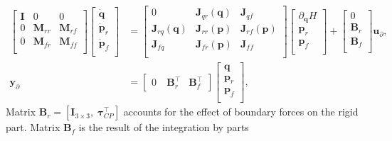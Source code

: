 \documentclass{svjour3}                     %
\begin{document}
\begin{equation}
\label{eq:EB_sys}
\begin{aligned}
\begin{bmatrix}
\mathbf{I} & 0 & 0 \\
0 & \mathbf{M}_{rr} & \mathbf{M}_{rf}\\ 
0 & \mathbf{M}_{fr} & \mathbf{M}_{ff}\\
\end{bmatrix} 
\begin{bmatrix}
\dot{\mathbf{q}} \\ 
\dot{\mathbf{p}}_{r} \\ 
\dot{\mathbf{p}}_{f} \\ 
\end{bmatrix} &= 
\begin{bmatrix}
0 & \mathbf{J}_{qr}(\mathbf{q}) & \mathbf{J}_{qf} \\
\mathbf{J}_{rq}(\mathbf{q}) & \mathbf{J}_{rr}(\mathbf{p}) & \mathbf{J}_{rf}(\mathbf{p})\\ 
\mathbf{J}_{fq} & \mathbf{J}_{fr}(\mathbf{p}) & \mathbf{J}_{ff}\\
\end{bmatrix}  
\begin{bmatrix}
\partial_{\mathbf{q}} H \\
{\mathbf{p}}_{r} \\ 
{\mathbf{p}}_{f} \\ 
\end{bmatrix} + 
\begin{bmatrix}
0 \\
\mathbf{B}_{r} \\ 
\mathbf{B}_{f} \\ 
\end{bmatrix}
\mathbf{u}_\partial, \\
\mathbf{y}_\partial &= \begin{bmatrix}
0 \ & \mathbf{B}_{r}^\top & \mathbf{B}_{f}^\top  
\end{bmatrix} \begin{bmatrix}
\mathbf{q} \\
{\mathbf{p}}_{r} \\ 
{\mathbf{p}}_{f} \\ 
\end{bmatrix},
\end{aligned}
\end{equation}
Matrix $\mathbf{B}_{r} = [\mathbf{I}_{3\times 3}, \; \bm\tau_{CP}^\top]$ accounts for the effect of boundary forces on the rigid part. Matrix $\mathbf{B}_{f}$  is the result of the integration by parts
\end{document}
